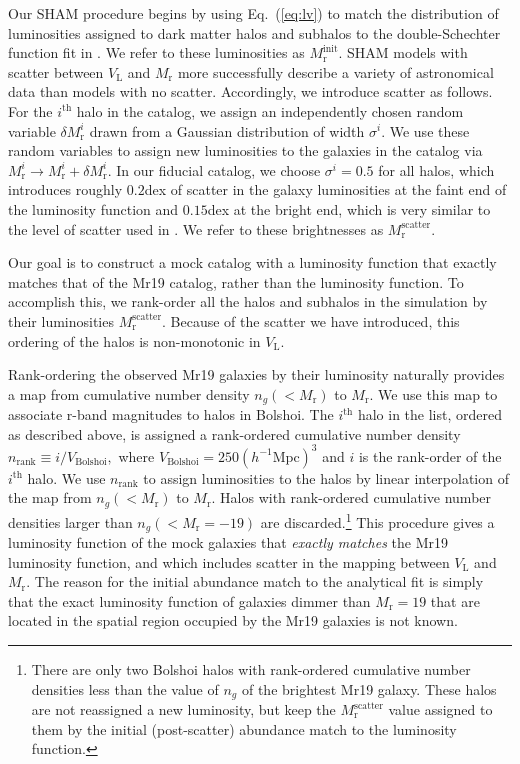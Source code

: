 \documentclass[usenatbib,usegraphicx,letterpaper]{mn2e}
\newcommand{\vl}{V_{\mathrm{L}}}
\newcommand{\ngal}{n_{g}}
\newcommand{\mri}{M_{\mathrm{r}}^{i}}
\newcommand{\mr}{M_{\mathrm{r}}}
\newcommand{\sigmai}{\sigma^{i}}
\newcommand{\vbolshoi}{V_{\mathrm{Bolshoi}}}
\newcommand{\linit}{M^{\mathrm{init}}_{\mathrm{r}}}
\newcommand{\lscatter}{M^{\mathrm{scatter}}_{\mathrm{r}}}
\newcommand{\nrank}{n_{\mathrm{rank}}}
\newcommand{\hmpc}{h^{-1}\mathrm{Mpc}}
\newcommand{\ith}{i^{\mathrm{th}}}
\begin{document}
Our SHAM procedure begins by using Eq.~(\ref{eq:lv}) to match the
distribution of luminosities assigned to dark matter halos and
subhalos to the double-Schechter function fit in
\citet{blanton_etal05}. We refer to these luminosities as $\linit.$
SHAM models with scatter between $\vl$ and $\mr$ more successfully
describe a variety of astronomical data \citep[see][and references
therein]{klypin_etal11,trujillo-gomez_etal11,watson_etal11} than
models with no scatter. Accordingly, we introduce scatter as follows. For the
$\ith$ halo in the catalog, we assign an independently chosen random
variable $\delta\mri$ drawn from a Gaussian distribution of width
$\sigmai.$ We use these random variables to assign new luminosities to
the galaxies in the catalog via $\mri\rightarrow\mri+\delta\mri.$ In
our fiducial catalog, we choose $\sigmai=0.5$ for all halos, which
introduces roughly $0.2$dex of scatter in the galaxy luminosities at the faint end of the luminosity function and $0.15$dex at the bright end,
which is very similar to the level of scatter used in \citet{trujillo-gomez_etal11}. We refer to these brightnesses as
$\lscatter.$

Our goal is to construct a mock catalog with a luminosity function
that exactly matches that of the Mr19 catalog, rather than the
\citet{blanton_etal05} luminosity function. To accomplish this, we
rank-order all the halos and subhalos in the simulation by their
luminosities $\lscatter.$ Because of the scatter we have introduced, this ordering of the halos is
non-monotonic in $\vl.$ 

Rank-ordering the observed Mr19 galaxies by their luminosity naturally provides a map from cumulative number density $\ngal(<\mr)$ to $\mr.$ We use this map to associate r-band magnitudes to halos
in Bolshoi. The $\ith$ halo in the list, ordered as described above,
is assigned a rank-ordered cumulative number density $\nrank\equiv i/\vbolshoi,$ where
$\vbolshoi=250(\hmpc)^3$ and $i$ is the rank-order of the $\ith$ halo. We use $\nrank$ to
assign luminosities to the halos by linear interpolation of the map
from $\ngal(<\mr)$ to $\mr.$ Halos with rank-ordered cumulative number
densities larger than $\ngal(<\mr=-19)$
are discarded.\footnote{There are only two Bolshoi halos with rank-ordered cumulative 
number densities less than the value of $\ngal$ of the brightest Mr19
galaxy. These halos are not reassigned a new luminosity, but keep
the $\lscatter$ value assigned to them by the initial (post-scatter)
abundance match to the \citet{blanton_etal05} luminosity function.} This procedure gives a
luminosity function of the mock galaxies that {\em exactly matches}
the Mr19 luminosity function, and which includes scatter in the
mapping between $\vl$ and $\mr.$ The reason for the initial abundance match to the \citet{blanton_etal05} analytical fit is simply that the exact luminosity function of galaxies dimmer than $\mr=19$ that are located in the spatial region occupied by the Mr19 galaxies is not known.
\end{document}
